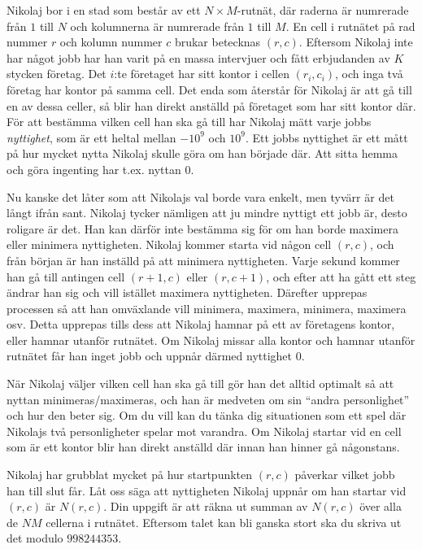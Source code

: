 Nikolaj bor i en stad som består av ett $N \times M$-rutnät, där raderna är numrerade från $1$ till $N$ och kolumnerna
är numrerade från $1$ till $M$. En cell i rutnätet på rad nummer $r$ och kolumn nummer $c$ brukar betecknas $(r, c)$.
Eftersom Nikolaj inte har något jobb har han varit 
på en massa intervjuer och fått erbjudanden av $K$ stycken företag. Det $i$:te företaget har sitt kontor i cellen 
$(r_i, c_i)$, och inga två företag har kontor på samma cell. Det enda som återstår för Nikolaj är att gå till en
av dessa celler, så blir han direkt anställd på företaget som har sitt kontor där. För att bestämma vilken cell 
han ska gå till har Nikolaj mätt varje jobbs \textit{nyttighet}, som är ett heltal mellan $-10^9$ och $10^9$.
Ett jobbs nyttighet är ett mått på hur mycket nytta Nikolaj skulle göra om han började där. Att sitta hemma och 
göra ingenting har t.ex. nyttan $0$.

Nu kanske det låter som att Nikolajs val borde vara enkelt, men tyvärr är det långt ifrån sant. Nikolaj tycker nämligen att 
ju mindre nyttigt ett jobb är, desto roligare är det. Han kan därför inte bestämma sig för om han borde maximera eller
minimera nyttigheten. Nikolaj kommer starta vid någon cell $(r, c)$, och från början är han inställd på att minimera
nyttigheten. Varje sekund kommer han gå till antingen cell $(r+1, c)$ eller $(r, c+1)$, och efter att ha gått ett steg
ändrar han sig och vill istället maximera nyttigheten. Därefter upprepas processen så att han omväxlande vill minimera, maximera, 
minimera, maximera osv. Detta upprepas tills dess att Nikolaj hamnar på ett av företagens kontor, eller hamnar utanför
rutnätet. Om Nikolaj missar alla kontor och hamnar utanför rutnätet får han inget jobb och uppnår därmed nyttighet $0$.

När Nikolaj väljer vilken cell han ska gå till gör han det alltid optimalt så att nyttan minimeras/maximeras, 
och han är medveten om sin ``andra personlighet'' och hur den beter sig.
Om du vill kan du tänka dig situationen som ett spel där Nikolajs två personligheter spelar mot varandra.
Om Nikolaj startar vid en cell som är ett kontor blir han direkt anställd där innan han hinner gå någonstans.

Nikolaj har grubblat mycket på hur startpunkten $(r, c)$ påverkar vilket jobb han till slut får. Låt oss säga 
att nyttigheten Nikolaj uppnår om han startar vid $(r, c)$ är $N(r, c)$. Din uppgift är att räkna ut summan av 
$N(r, c)$ över alla de $NM$ cellerna i rutnätet. Eftersom talet kan bli ganska stort ska du skriva ut det modulo $998244353$.


